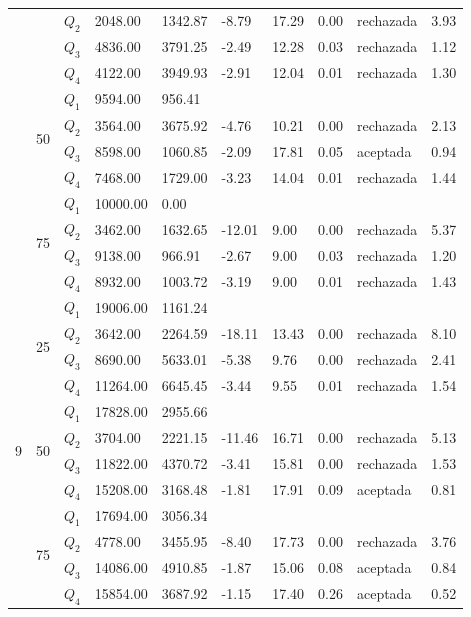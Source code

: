 \begin{table}[]
\begin{tabular}{|l|l|l|l|l|l|l|l|l|l|}
 &  & $Q_2$ & 2048.00 & 1342.87 & -8.79 & 17.29 & 0.00 & rechazada & 3.93 \\ \cline{3-10} 
 &  & $Q_3$ & 4836.00 & 3791.25 & -2.49 & 12.28 & 0.03 & rechazada & 1.12 \\ \cline{3-10} 
 &  & $Q_4$ & 4122.00 & 3949.93 & -2.91 & 12.04 & 0.01 & rechazada & 1.30 \\ \cline{2-10} 
 & \multirow{4}{*}{50} & $Q_1$ & 9594.00 & 956.41 & \multicolumn{5}{l|}{} \\ \cline{3-10} 
 &  & $Q_2$ & 3564.00 & 3675.92 & -4.76 & 10.21 & 0.00 & rechazada & 2.13 \\ \cline{3-10} 
 &  & $Q_3$ & 8598.00 & 1060.85 & -2.09 & 17.81 & 0.05 & aceptada & 0.94 \\ \cline{3-10} 
 &  & $Q_4$ & 7468.00 & 1729.00 & -3.23 & 14.04 & 0.01 & rechazada & 1.44 \\ \cline{2-10} 
 & \multirow{4}{*}{75} & $Q_1$ & 10000.00 & 0.00 & \multicolumn{5}{l|}{} \\ \cline{3-10} 
 &  & $Q_2$ & 3462.00 & 1632.65 & -12.01 & 9.00 & 0.00 & rechazada & 5.37 \\ \cline{3-10} 
 &  & $Q_3$ & 9138.00 & 966.91 & -2.67 & 9.00 & 0.03 & rechazada & 1.20 \\ \cline{3-10} 
 &  & $Q_4$ & 8932.00 & 1003.72 & -3.19 & 9.00 & 0.01 & rechazada & 1.43 \\ \hline
\multirow{12}{*}{9} & \multirow{4}{*}{25} & $Q_1$ & 19006.00 & 1161.24 & \multicolumn{5}{l|}{} \\ \cline{3-10} 
 &  & $Q_2$ & 3642.00 & 2264.59 & -18.11 & 13.43 & 0.00 & rechazada & 8.10 \\ \cline{3-10} 
 &  & $Q_3$ & 8690.00 & 5633.01 & -5.38 & 9.76 & 0.00 & rechazada & 2.41 \\ \cline{3-10} 
 &  & $Q_4$ & 11264.00 & 6645.45 & -3.44 & 9.55 & 0.01 & rechazada & 1.54 \\ \cline{2-10} 
 & \multirow{4}{*}{50} & $Q_1$ & 17828.00 & 2955.66 & \multicolumn{5}{l|}{} \\ \cline{3-10} 
 &  & $Q_2$ & 3704.00 & 2221.15 & -11.46 & 16.71 & 0.00 & rechazada & 5.13 \\ \cline{3-10} 
 &  & $Q_3$ & 11822.00 & 4370.72 & -3.41 & 15.81 & 0.00 & rechazada & 1.53 \\ \cline{3-10} 
 &  & $Q_4$ & 15208.00 & 3168.48 & -1.81 & 17.91 & 0.09 & aceptada & 0.81 \\ \cline{2-10} 
 & \multirow{4}{*}{75} & $Q_1$ & 17694.00 & 3056.34 & \multicolumn{5}{l|}{} \\ \cline{3-10} 
 &  & $Q_2$ & 4778.00 & 3455.95 & -8.40 & 17.73 & 0.00 & rechazada & 3.76 \\ \cline{3-10} 
 &  & $Q_3$ & 14086.00 & 4910.85 & -1.87 & 15.06 & 0.08 & aceptada & 0.84 \\ \cline{3-10} 
 &  & $Q_4$ & 15854.00 & 3687.92 & -1.15 & 17.40 & 0.26 & aceptada & 0.52 \\ \hline
\end{tabular}
\end{table}



